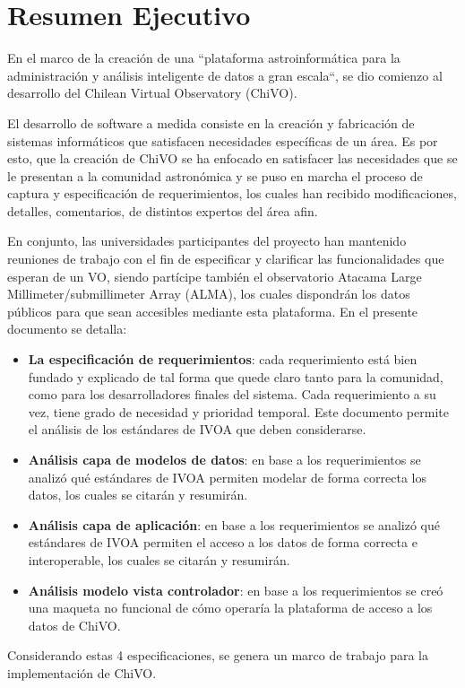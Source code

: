 \section{Resumen Ejecutivo}

En el marco de la creación de una ``plataforma
astroinformática para la administración y análisis inteligente de datos a gran
escala``, se dio comienzo al desarrollo del Chilean Virtual Observatory (ChiVO).

El desarrollo de software a medida consiste en la creación y fabricación de
sistemas informáticos que satisfacen necesidades específicas de un área. Es por
esto, que la creación de ChiVO se ha enfocado en satisfacer las necesidades que
se le presentan a la comunidad astronómica y se puso en marcha el proceso de
captura y especificación de requerimientos, los cuales han recibido
modificaciones, detalles, comentarios, de distintos expertos del área afin.

En conjunto, las universidades participantes del proyecto han mantenido
reuniones de trabajo con el fin de especificar y clarificar las funcionalidades
que esperan de un VO, siendo partícipe también el observatorio Atacama Large
Millimeter/submillimeter Array (ALMA), los cuales dispondrán los datos públicos
para que sean accesibles mediante esta plataforma. En el presente documento se
detalla:
\begin{itemize}
	\item \textbf{La especificación de requerimientos}: cada requerimiento está bien
fundado y explicado de tal forma que quede claro tanto para la comunidad, como
para los desarrolladores finales del sistema. Cada requerimiento a su vez,
tiene grado de necesidad y prioridad temporal. Este documento permite el
análisis de los estándares de IVOA que deben considerarse.
	\item \textbf{Análisis capa de modelos de datos}: en base a los requerimientos
se analizó qué estándares de IVOA permiten modelar de forma correcta los datos,
los cuales se citarán y resumirán.
	\item \textbf{Análisis capa de aplicación}: en base a los requerimientos se
analizó qué estándares de IVOA permiten el acceso a los datos de forma correcta
e interoperable, los cuales se citarán y resumirán.
	\item \textbf{Análisis modelo vista controlador}: en base a los requerimientos
se creó una maqueta no funcional de cómo operaría la plataforma de acceso a los
datos de ChiVO.
\end{itemize}

Considerando estas 4 especificaciones, se genera un marco de trabajo para la implementación de ChiVO.
